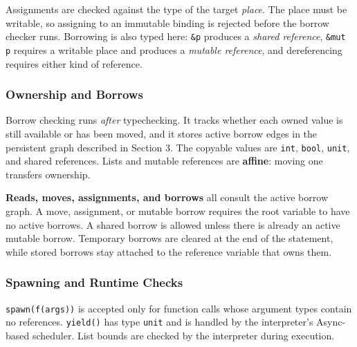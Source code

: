 \documentclass[a4paper]{article}
\begin{document}
Assignments are checked against the type of the target \emph{place}. The place
must be writable, so assigning to an immutable binding is rejected before the
borrow checker runs. Borrowing is also typed here: \texttt{\&p} produces a
\emph{shared reference}, \texttt{\&mut p} requires a writable place and produces
a \emph{mutable reference}, and dereferencing requires either kind of reference.

\subsubsection{Ownership and Borrows}

Borrow checking runs \emph{after} typechecking. It tracks whether each owned value is
still available or has been moved, and it stores active borrow edges in the
persistent graph described in Section 3. The copyable values are
\texttt{int}, \texttt{bool}, \texttt{unit}, and shared references. Lists and
mutable references are \textbf{affine}: moving one transfers ownership.

\textbf{Reads, moves, assignments, and borrows} all consult the active borrow
graph. A move, assignment, or mutable borrow requires the root variable to have
no active borrows. A shared borrow is allowed unless there is already an active
mutable borrow. Temporary borrows are cleared at the end of the statement, while
stored borrows stay attached to the reference variable that owns them.

\subsubsection{Spawning and Runtime Checks}

\texttt{spawn(f(args))} is accepted only for function calls whose argument types
contain no references. \texttt{yield()} has type \texttt{unit} and is handled by
the interpreter's Async-based scheduler. List bounds are checked by the
interpreter during execution.
\end{document}
